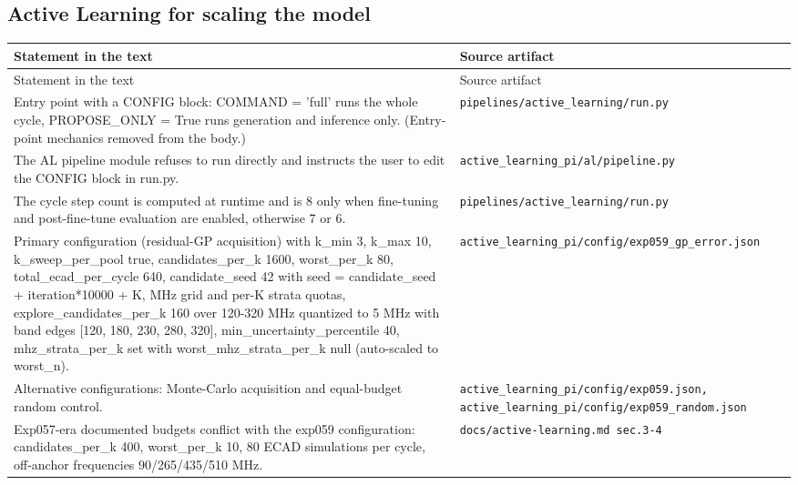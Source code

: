 \subsection*{Active Learning for scaling the model}
\begingroup\small
\begin{longtable}{p{} p{}}
\hline
Statement in the text & Source artifact \\
\hline
\endfirsthead
\hline
Statement in the text & Source artifact \\
\hline
\endhead
Entry point with a CONFIG block: COMMAND = 'full' runs the whole cycle, PROPOSE\_ONLY = True runs generation and inference only. (Entry-point mechanics removed from the body.) & \texttt{pipelines/\allowbreak{}active\_\allowbreak{}learning/\allowbreak{}run.py} \\
The AL pipeline module refuses to run directly and instructs the user to edit the CONFIG block in run.py. & \texttt{active\_\allowbreak{}learning\_\allowbreak{}pi/\allowbreak{}al/\allowbreak{}pipeline.py} \\
The cycle step count is computed at runtime and is 8 only when fine-tuning and post-fine-tune evaluation are enabled, otherwise 7 or 6. & \texttt{pipelines/\allowbreak{}active\_\allowbreak{}learning/\allowbreak{}run.py} \\
Primary configuration (residual-GP acquisition) with k\_min 3, k\_max 10, k\_sweep\_per\_pool true, candidates\_per\_k 1600, worst\_per\_k 80, total\_ecad\_per\_cycle 640, candidate\_seed 42 with seed = candidate\_seed + iteration*10000 + K, MHz grid and per-K strata quotas, explore\_candidates\_per\_k 160 over 120-320 MHz quantized to 5 MHz with band edges [120, 180, 230, 280, 320], min\_uncertainty\_percentile 40, mhz\_strata\_per\_k set with worst\_mhz\_strata\_per\_k null (auto-scaled to worst\_n). & \texttt{active\_\allowbreak{}learning\_\allowbreak{}pi/\allowbreak{}config/\allowbreak{}exp059\_\allowbreak{}gp\_\allowbreak{}error.json} \\
Alternative configurations: Monte-Carlo acquisition and equal-budget random control. & \texttt{active\_\allowbreak{}learning\_\allowbreak{}pi/\allowbreak{}config/\allowbreak{}exp059.json, active\_\allowbreak{}learning\_\allowbreak{}pi/\allowbreak{}config/\allowbreak{}exp059\_\allowbreak{}random.json} \\
Exp057-era documented budgets conflict with the exp059 configuration: candidates\_per\_k 400, worst\_per\_k 10, 80 ECAD simulations per cycle, off-anchor frequencies 90/265/435/510 MHz. & \texttt{docs/\allowbreak{}active-learning.md sec.3-4} \\

\end{longtable}
